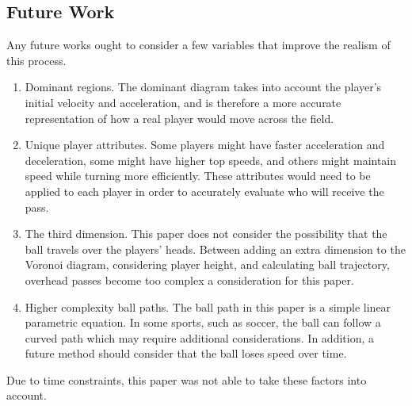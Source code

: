 \documentclass[11pt]{article}
\begin{document}
\subsection*{Future Work}
Any future works ought to consider a few variables that improve the realism of this process.
\begin{enumerate}
    \item Dominant regions. The dominant diagram takes into account the player's initial velocity and acceleration, and is therefore a more accurate representation of how a
    real player would move across the field.

    \item Unique player attributes. Some players might have faster acceleration and deceleration, some might have higher top speeds, and others might maintain speed while
    turning more efficiently. These attributes would need to be applied to each player in order to accurately evaluate who will receive the pass.

    \item The third dimension. This paper does not consider the possibility that the ball travels over the players' heads. Between adding an extra dimension to the Voronoi diagram,
    considering player height, and calculating ball trajectory, overhead passes become too complex a consideration for this paper.

    \item Higher complexity ball paths. The ball path in this paper is a simple linear parametric equation. In some sports, such as soccer, the ball can follow a curved path which may
    require additional considerations. In addition, a future method should consider that the ball loses speed over time.
\end{enumerate}
Due to time constraints, this paper was not able to take these factors into account.

{}

\end{document}
